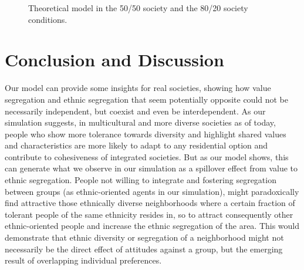 \documentclass{ws-acs}
\begin{document}
{\begin{figure}[th]
\centerline{}
\vspace*{8pt}
\caption{Theoretical model in the 50/50 society and the 80/20 society conditions.}
\label{fig:Modelconditions}
\end{figure}

\section{Conclusion and Discussion}

Our model can provide some insights for real societies, showing how value segregation and ethnic segregation that seem potentially opposite could not be necessarily independent, but coexist and even be interdependent. As our simulation suggests, in multicultural and more diverse societies as of today, people who show more tolerance towards diversity and highlight shared values and characteristics are more likely to adapt to any residential option and contribute to cohesiveness of integrated societies. But as our model shows, this can  generate what we observe in our simulation as a spillover effect from value to ethnic segregation. People not willing to integrate and fostering segregation between groups (as ethnic-oriented agents in our simulation), might paradoxically find attractive those ethnically diverse neighborhoods where a certain fraction of tolerant people of the same ethnicity resides in, so to attract consequently other ethnic-oriented people and increase  the ethnic segregation of the area. This would demonstrate that ethnic diversity or segregation of a neighborhood might not necessarily be the direct effect of attitudes against a group, but the emerging result of overlapping individual preferences.

}
\end{document}

